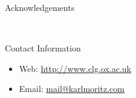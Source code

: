 \documentclass[final]{beamer}
\newlength{\sepwid}
\newlength{\onecolwid}
\begin{document}
\begin{frame}[t]
\begin{columns}[t]
\begin{column}{\onecolwid}
      \begin{block}{Acknowledgements}

        \small{} \\

      \end{block}



      \begin{alertblock}{Contact Information}

        \begin{itemize}
          \item Web: \href{http://www.clg.ox.ac.uk}{http://www.clg.ox.ac.uk}
          \item Email: \href{mailto:mail@karlmoritz.com}{mail@karlmoritz.com}
        \end{itemize}

      \end{alertblock}


    \end{column} %

  \begin{column}{\sepwid}\end{column} %

  \end{columns} %

\end{frame} %
\end{document}
